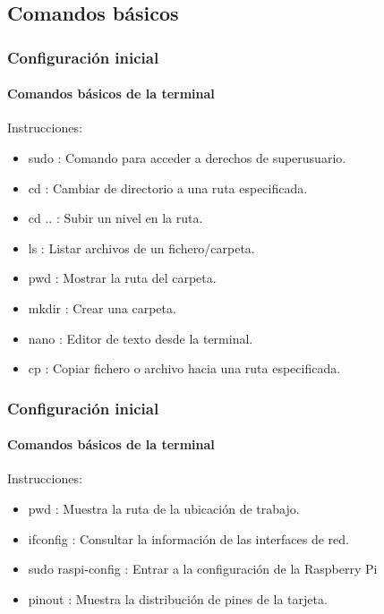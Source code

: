 \documentclass{beamer}
\begin{document}
	\subsection{Comandos básicos}
	\begin{frame}
		\frametitle{Configuración inicial}
		\framesubtitle{Comandos básicos de la terminal}
		\begin{mybox}{Instrucciones:}
			\begin{itemize}
				\item sudo :  Comando para acceder a derechos de superusuario.
				\item cd  : Cambiar de directorio a una ruta especificada.
				\item cd .. : Subir un nivel en la ruta.
				\item ls  : Listar archivos de un fichero/carpeta.
				\item pwd : Mostrar la ruta del carpeta.
				\item mkdir : Crear una carpeta.
				\item nano : Editor de texto desde la terminal.
				\item cp   : Copiar fichero o archivo hacia una ruta especificada.
				
				
			\end{itemize}
		\end{mybox}
		
	\end{frame}
	
	\begin{frame}
		\frametitle{Configuración inicial}
		\framesubtitle{Comandos básicos de la terminal}
		\begin{mybox}{Instrucciones:}
			\begin{itemize}
				\item pwd : Muestra la ruta de la ubicación de trabajo.
				\item ifconfig : Consultar la información de las interfaces de red.
				\item sudo raspi-config : Entrar a la configuración de la Raspberry Pi
				\item pinout : Muestra la distribución de pines de la tarjeta.
			\end{itemize}
		\end{mybox}
		
		
	\end{frame}
\end{document}
